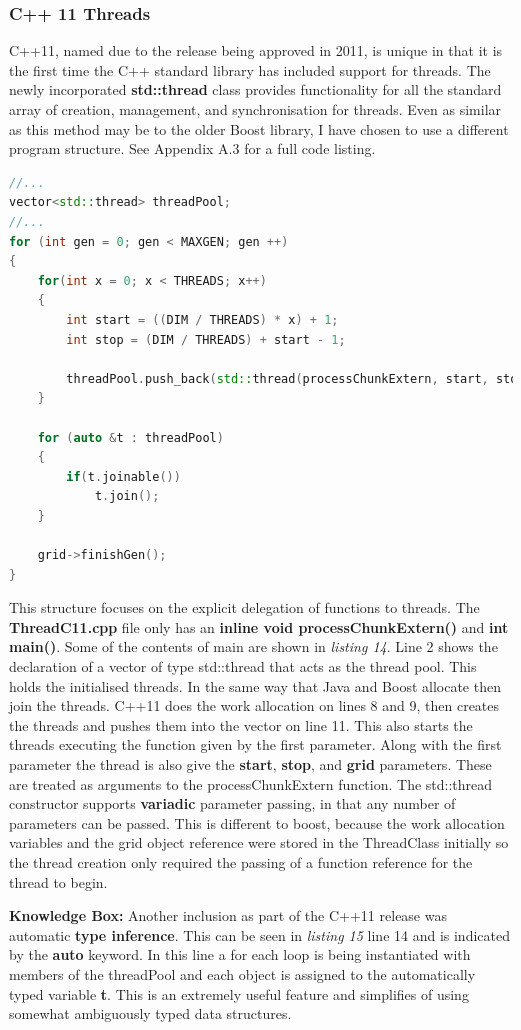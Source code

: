 \documentclass[11pt]{article} %
\begin{document}
\subsubsection{C++ 11 Threads}
C++11, named due to the release being approved in 2011, is unique in that it is the first time the C++ standard library has included support for threads. The newly incorporated {\bf std::thread} class provides functionality for all the standard array of creation, management, and synchronisation for threads. Even as similar as this method may be to the older Boost library, I have chosen to use a different program structure. See Appendix A.3 for a full code listing.
\begin{lstlisting}[language=c++, caption={Main game loop from C++ 11 implementation}]
//...    
vector<std::thread> threadPool;
//...
for (int gen = 0; gen < MAXGEN; gen ++)
{
    for(int x = 0; x < THREADS; x++)
    {
        int start = ((DIM / THREADS) * x) + 1;
        int stop = (DIM / THREADS) + start - 1;

        threadPool.push_back(std::thread(processChunkExtern, start, stop, grid));
    }
    
    for (auto &t : threadPool)
    {
        if(t.joinable())
            t.join();
    }
    
    grid->finishGen();
}
\end{lstlisting}
This structure focuses on the explicit delegation of functions to threads. The {\bf ThreadC11.cpp} file only has an {\bf inline void processChunkExtern()} and {\bf int main()}. Some of the contents of main are shown in {\it listing 14}. Line 2 shows the declaration of a vector of type std::thread that acts as the thread pool. This holds the initialised threads. In the same way that Java and Boost allocate then join the threads. C++11 does the work allocation on lines 8 and 9, then creates the threads and pushes them into the vector on line 11. This also starts the threads executing the function given by the first parameter. Along with the first parameter the thread is also give the {\bf start}, {\bf stop}, and {\bf grid} parameters. These are treated as arguments to the processChunkExtern function. The std::thread constructor supports {\bf variadic} parameter passing, in that any number of parameters can be passed. This is different to boost, because the work allocation variables and the grid object reference were stored in the ThreadClass initially so the thread creation only required the passing of a function reference for the thread to begin.
\bigskip
\begin{mdframed}
{\bf Knowledge Box:} Another inclusion as part of the C++11 release was automatic {\bf type inference}. This can be seen in {\it listing 15} line 14 and is indicated by the {\bf auto} keyword. In this line a for each loop is being instantiated with members of the threadPool and each object is assigned to the automatically typed variable {\bf t}. This is an extremely useful feature and simplifies of using somewhat ambiguously typed data structures.
\end{mdframed}
\end{document}
